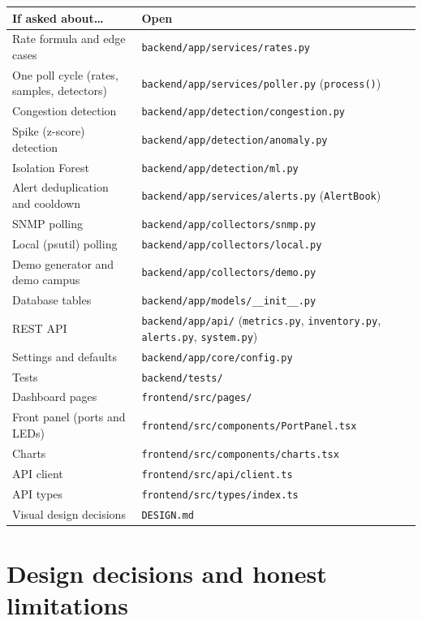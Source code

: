 \documentclass[11pt,a4paper]{article}
\newcommand{\code}[1]{\texttt{#1}}
\newcommand{\file}[1]{\texttt{\color{ink}#1}}
\begin{document}
\begin{center}
\small
\begin{tabularx}{\linewidth}{@{}l Y@{}}
\toprule
\textbf{If asked about\ldots} & \textbf{Open} \\
\midrule
Rate formula and edge cases & \file{backend/app/services/rates.py} \\
One poll cycle (rates, samples, detectors) & \file{backend/app/services/poller.py} (\code{process()}) \\
Congestion detection & \file{backend/app/detection/congestion.py} \\
Spike (z-score) detection & \file{backend/app/detection/anomaly.py} \\
Isolation Forest & \file{backend/app/detection/ml.py} \\
Alert deduplication and cooldown & \file{backend/app/services/alerts.py} (\code{AlertBook}) \\
SNMP polling & \file{backend/app/collectors/snmp.py} \\
Local (psutil) polling & \file{backend/app/collectors/local.py} \\
Demo generator and demo campus & \file{backend/app/collectors/demo.py} \\
Database tables & \file{backend/app/models/\_\_init\_\_.py} \\
REST API & \file{backend/app/api/} (\code{metrics.py}, \code{inventory.py}, \code{alerts.py}, \code{system.py}) \\
Settings and defaults & \file{backend/app/core/config.py} \\
Tests & \file{backend/tests/} \\
Dashboard pages & \file{frontend/src/pages/} \\
Front panel (ports and LEDs) & \file{frontend/src/components/PortPanel.tsx} \\
Charts & \file{frontend/src/components/charts.tsx} \\
API client & \file{frontend/src/api/client.ts} \\
API types & \file{frontend/src/types/index.ts} \\
Visual design decisions & \file{DESIGN.md} \\
\bottomrule
\end{tabularx}
\end{center}

\section{Design decisions and honest limitations}
\end{document}
